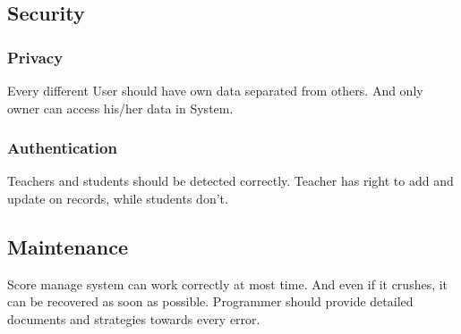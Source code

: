 \documentclass[a4]{article}
\begin{document}
\subsection{Security} 
\subsubsection{Privacy} 

Every different User should have own data separated from others. And only owner can access his/her data in System.

\subsubsection{Authentication}

Teachers and students should be detected correctly. Teacher has right to add and update on records, while students don't.

\subsection{Maintenance}

Score manage system can work correctly at most time. And even if it crushes, it can be recovered as soon as possible. Programmer should provide detailed documents and strategies towards every error.
\end{document}
